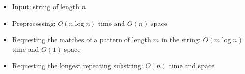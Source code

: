 \begin{itemize}
	\item Input: string of length $n$
	\item Preprocessing: $O(n\log{n})$ time and $O(n)$ space
	\item Requesting the matches of a pattern of length $m$ in the string: $O(m\log{n})$ time and $O(1)$ space
	\item Requesting the longest repeating substring: $O(n)$ time and space
\end{itemize}